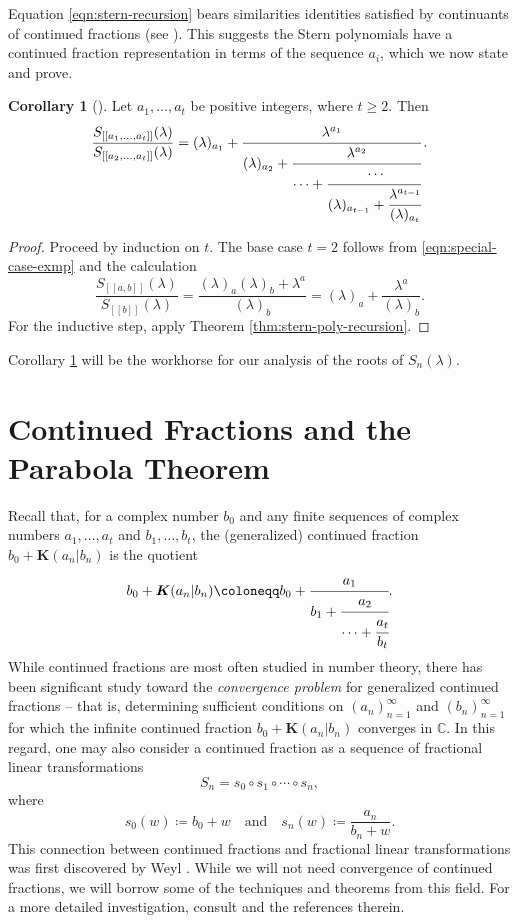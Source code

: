 \documentclass[11pt]{article}
\theoremstyle{definition}
\newtheorem{corr}{Corollary}
\newcommand{\stern}[2]{S_{#1}(#2)}
\newcommand{\lm}{\lambda}
\newcommand{\C}{\mathbb C}
\begin{document}
Equation \eqref{eqn:stern-recursion} bears similarities identities satisfied by continuants of continued fractions (see \cite{Khinchin1997}).  This suggests the Stern polynomials have a continued fraction representation in terms of the sequence $a_i$, which we now state and prove.

\begin{corr}[{\cite[Theorem 1]{Schinzel2014}}]\label{thm:stern-cont-frac}
	Let $a_1,\ldots, a_t$ be positive integers, where $t\geq 2$.  Then 
	\begin{equation}\label{eqn:stern-cont-frac}
		\frac{\stern{[[a_1,\ldots, a_t]]}{\lm}}{\stern{[[a_2,\ldots, a_t]]}{\lm}}
		=
		(\lm)_{a_1} + \cfrac{\lm^{a_1}}{(\lm)_{a_2} + \cfrac{\lm^{a_2}}{\cdots + \cfrac{\cdots}{(\lm)_{a_{t-1}} + \cfrac{\lm^{a_{t-1}}}{(\lm)_{a_t}}}}}\,.
	\end{equation}
\end{corr}

\begin{proof}
	Proceed by induction on $t$.  The base case $t = 2$ follows from \eqref{eqn:special-case-exmp} and the calculation
	\[
	\frac{\stern{[[a,b]]}\lm}{\stern{[[b]]}\lm} = \frac{(\lm)_a(\lm)_b+\lm^a}{(\lm)_b} = (\lm)_a + \frac{\lm^a}{(\lm)_b}.
	\] 
	For the inductive step, apply Theorem \ref{thm:stern-poly-recursion}.
\end{proof}
Corollary \ref{thm:stern-cont-frac} will be the workhorse for our analysis of the roots of $\stern n\lm$.

\section{Continued Fractions and the Parabola Theorem}

Recall that, for a complex number $b_0$ and any finite sequences of complex numbers $a_1,\ldots, a_t$ and $b_1,\ldots, b_t$, the (generalized) continued fraction $b_0 + \boldsymbol{K}(a_n|b_n)$ is the quotient
\[
b_0 + \boldsymbol{K}(a_n|b_n) \coloneqq b_0 + \cfrac{a_1}{b_1 + \cfrac{a_2}{\cdots + \cfrac{a_t}{b_t}}}.
\]
While continued fractions are most often studied in number theory, there has been significant study toward the \textit{convergence problem} for generalized continued fractions -- that is, determining sufficient conditions on $(a_n)_{n=1}^\infty$ and $(b_n)_{n=1}^\infty$ for which the infinite continued fraction $b_0 + \boldsymbol{K}(a_n|b_n)$ converges in $\C$.  In this regard, one may also consider a continued fraction as a sequence of fractional linear transformations
\begin{equation}\label{eqn:geom-cont}
	S_n = s_0\circ s_1\circ\cdots\circ s_n,
\end{equation}
where 
\[
s_0(w) \coloneqq b_0 + w\quad\text{and}\quad s_n(w) \coloneqq \frac{a_n}{b_n + w}.
\]
This connection between continued fractions and fractional linear transformations was first discovered by Weyl \cite{Weyl1910}. While we will not need convergence of continued fractions, we will borrow some of the techniques and theorems from this field.  For a more detailed investigation, consult \cite[Chapter 3]{Lorentzen2008} and the references therein.
\end{document}
